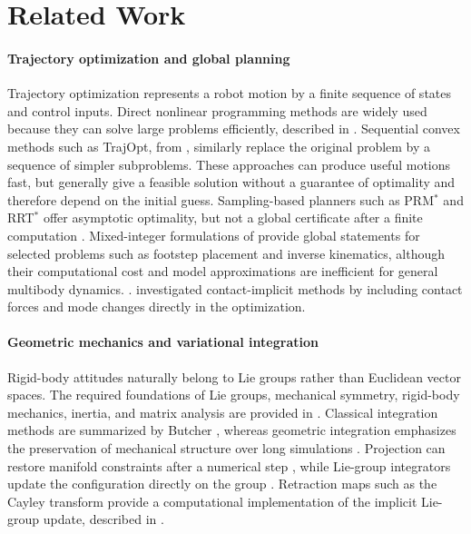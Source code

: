 \section{Related Work}
\label{sec:introduction_related_work}

\paragraph{Trajectory optimization and global planning}

Trajectory optimization represents a robot motion by a finite sequence of states
and control inputs. Direct nonlinear programming methods are widely used
because they can solve large problems efficiently, described in
\cite{Betts1998TrajectoryOptimization,tedrake_underactuated}. Sequential convex
methods such as TrajOpt, from \cite{Schulman2014TrajOpt}, similarly replace the original problem by a sequence of
simpler subproblems. These approaches can produce useful
motions fast, but generally give a feasible solution without a guarantee of optimality 
and therefore depend on the initial guess. Sampling-based planners such as PRM$^*$ and RRT$^*$
offer asymptotic optimality, but not a global certificate after a finite computation
\cite{KaramanFrazzoli2011Sampling}. Mixed-integer formulations of 
\cite{DeitsTedrake2014Footstep,DaiIzattTedrake2019IK} provide global
statements for selected problems such as footstep placement and inverse kinematics,
although their computational cost and model approximations are inefficient for
general multibody dynamics.
\cite{Posa2014Contact,Manchester2019ContactVI}.
investigated contact-implicit methods
by including contact forces and mode changes directly in the optimization.

\paragraph{Geometric mechanics and variational integration}

Rigid-body attitudes naturally belong to Lie groups rather than Euclidean vector
spaces. The required foundations of Lie groups, mechanical symmetry, rigid-body
mechanics, inertia, and matrix analysis are provided in
\cite{Hall2000LieGroups,MarsdenRatiu1999,Benacquista2018ClassicalMechanics,
RITInertiaTable216,GallierQuaintance2020LinearAlgebra,YanaiTakeuchiTakane2011SVD}.
Classical integration methods are summarized by Butcher
\cite{butcher2016numerical}, whereas geometric integration emphasizes the
preservation of mechanical structure over long simulations
\cite{Hairer1994,Leimkuhler_Reich_2005}. Projection can restore manifold
constraints after a numerical step \cite{Hairer2000}, while Lie-group integrators
update the configuration directly on the group \cite{CELLEDONI2003421}.
Retraction maps such as the Cayley transform provide a
computational implementation of the implicit Lie-group update, described in
\cite{Arieh_Cayley_Motivation,ColomboJimenez2012SO3_Cayley,
Barbero-Linan2023_Cayley_Formula}.

